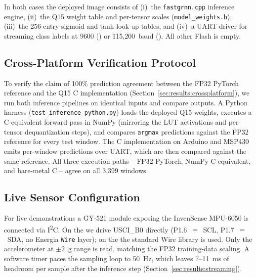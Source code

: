 In both cases the deployed image consists of (i)~the
\texttt{fastgrnn.cpp} inference engine,
(ii)~the Q15 weight table and per-tensor scales
(\texttt{model\_weights.h}),
(iii)~the 256-entry sigmoid and tanh look-up tables, and
(iv)~a UART driver for streaming class labels at 9600 (\msp{}) or
115{,}200~baud (\arduino{}). All other Flash is empty.

\subsection{Cross-Platform Verification Protocol}
\label{sec:setup:verify}

To verify the claim of 100\% prediction agreement between the
FP32 PyTorch reference and the Q15 C implementation
(Section~\ref{sec:results:crossplatform}), we run both inference
pipelines on identical inputs and compare outputs. A Python harness
(\texttt{test\_inference\_python.py}) loads the deployed Q15
weights, executes a C-equivalent forward pass in NumPy (mirroring
the LUT activations and per-tensor dequantization steps), and
compares \texttt{argmax} predictions against the FP32 reference
for every test window. The C implementation on Arduino and MSP430
emits per-window predictions over UART, which are then compared
against the same reference. All three execution paths -- FP32
PyTorch, NumPy C-equivalent, and bare-metal C -- agree on all
3{,}399 windows.

\subsection{Live Sensor Configuration}

For live demonstrations a GY-521 module exposing the InvenSense
MPU-6050 is connected via I\textsuperscript{2}C. On the \msp{} we
drive USCI\_B0 directly (P1.6~$=$~SCL, P1.7~$=$~SDA, no Energia
\texttt{Wire} layer); on the \arduino{} the standard Wire library
is used. Only the accelerometer at $\pm 2$~g range is read,
matching the FP32 training-data scaling. A software timer paces
the sampling loop to 50~Hz, which leaves 7--11~ms of headroom per
sample after the inference step
(Section~\ref{sec:results:streaming}).
